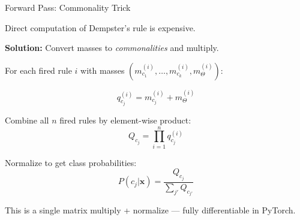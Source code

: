 \documentclass[aspectratio=169,12pt]{beamer}
\begin{document}
\begin{frame}{Forward Pass: Commonality Trick}

Direct computation of Dempster's rule is expensive.

\vspace{1em}
\textbf{Solution:} Convert masses to \textit{commonalities} and multiply.

\vspace{0.5em}
For each fired rule $i$ with masses $(m_{c_1}^{(i)}, \ldots, m_{c_k}^{(i)}, m_\Theta^{(i)})$:

$$q_{c_j}^{(i)} = m_{c_j}^{(i)} + m_\Theta^{(i)}$$

\vspace{0.5em}
Combine all $n$ fired rules by element-wise product:
$$Q_{c_j} = \prod_{i=1}^{n} q_{c_j}^{(i)}$$

\vspace{0.5em}
Normalize to get class probabilities:
$$P(c_j | \mathbf{x}) = \frac{Q_{c_j}}{\sum_{j'} Q_{c_{j'}}}$$

\vspace{0.5em}
This is a single matrix multiply + normalize --- fully differentiable in PyTorch.

\end{frame}
\end{document}
